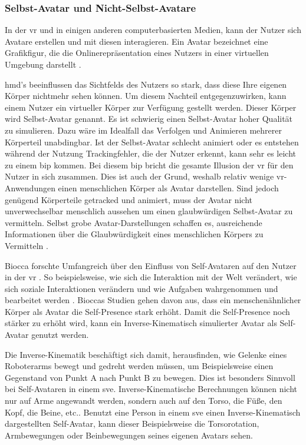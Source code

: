 \documentclass[a4paper,11pt]{article}%
\renewcommand{\\}{\vspace*{0.5\baselineskip} \newline}
\begin{document}
		\subsubsection{Selbst-Avatar und Nicht-Selbst-Avatare}

In der \ac{vr} und in einigen anderen computerbasierten Medien, kann der Nutzer sich Avatare erstellen und mit diesen interagieren. Ein Avatar bezeichnet eine Grafikfigur, die die Onlinerepräsentation eines Nutzers in einer virtuellen Umgebung darstellt \citep[p.1]{neustaedter2009presenting}.

\ac{hmd}'s beeinflussen das Sichtfelds des Nutzers so stark, dass diese Ihre eigenen Körper nichtmehr sehen können. Um diesem Nachteil entgegenzuwirken, kann einem Nutzer ein virtueller Körper zur Verfügung gestellt werden. Dieser Körper wird Selbst-Avatar genannt.
Es ist schwierig einen Selbst-Avatar hoher Qualität zu simulieren. Dazu wäre im Idealfall das Verfolgen und Animieren mehrerer Körperteil unabdingbar. Ist der Selbst-Avatar schlecht animiert oder es entstehen während der Nutzung Trackingfehler, die der Nutzer erkennt, kann sehr es leicht zu einem \ac{bip} kommen. Bei diesem \ac{bip} bricht die gesamte Illusion der \ac{vr} für den Nutzer in sich zusammen. 
Dies ist auch der Grund, weshalb relativ wenige \ac{vr}-Anwendungen einen menschlichen Körper als Avatar darstellen.
Sind jedoch genügend Körperteile getracked und animiert, muss der Avatar nicht unverwechselbar menschlich aussehen um einen glaubwürdigen Selbst-Avatar zu vermitteln. Selbst grobe Avatar-Darstellungen schaffen es, ausreichende Informationen über die Glaubwürdigkeit eines menschlichen Körpers zu Vermitteln \citep{lok2003effects} .

Biocca forschte Umfangreich über den Einfluss von Self-Avataren auf den Nutzer in der \ac{vr} \citep[421-427]{construal2014connected}.
\newline So beispielsweise, wie sich die Interaktion mit der Welt verändert, wie sich soziale Interaktionen verändern und wie Aufgaben wahrgenommen und bearbeitet werden \citep{benford1995user} \citep{bowers1996talk}.
Bioccas Studien gehen davon aus, dass ein menschenähnlicher Körper als Avatar die Self-Presence stark erhöht. Damit die Self-Presence noch stärker zu erhöht wird, kann ein Inverse-Kinematisch simulierter Avatar als Self-Avatar genutzt werden.

\label{inverseKinematik}
Die Inverse-Kinematik beschäftigt sich damit, herausfinden, wie Gelenke eines Roboterarms bewegt und gedreht werden müssen, um Beispielsweise einen Gegenstand von Punkt A nach Punkt B zu bewegen. Dies ist besonders Sinnvoll bei Self-Avataren in einem \ac{sve}. Inverse-Kinematische Berechnungen können nicht nur auf Arme angewandt werden, sondern auch auf den Torso, die Füße, den Kopf, die Beine, etc.. Benutzt eine Person in einem \ac{sve} einen Inverse-Kinematisch dargestellten Self-Avatar, kann dieser Beispielsweise die Torsorotation, Armbewegungen oder Beinbewegungen seines eigenen Avatars sehen.
\end{document}
